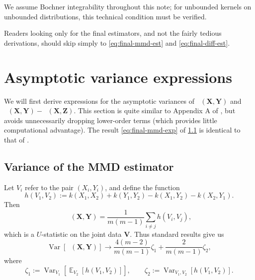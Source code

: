 \documentclass{article}
\DeclareMathOperator{\E}{\mathbb{E}}
\DeclareMathOperator{\Var}{Var}
\DeclareMathOperator{\mmdsqu}{\widehat{MMD}_U^2}
\newcommand{\setX}{\mathbf{X}}
\newcommand{\setY}{\mathbf{Y}}
\newcommand{\setZ}{\mathbf{Z}}
\newcommand{\setV}{\mathbf{V}}
\begin{document}
We assume Bochner integrability throughout this note;
for unbounded kernels on unbounded distributions,
this technical condition must be verified.

Readers looking only for the final estimators, and not the fairly tedious derivations,
should skip simply to \eqref{eq:final-mmd-est} and \eqref{eq:final-diff-est}. 


\section{Asymptotic variance expressions} \label{sec:var-expressions}

We will first derive expressions for the asymptotic variances of
$\mmdsqu(\setX, \setY)$
and $\mmdsqu(\setX, \setY) - \mmdsqu(\setX, \setZ)$.
This section is quite similar to Appendix A of \textcite{three-sample},
but avoids unnecessarily dropping lower-order terms (which provides little computational advantage).
The result \eqref{eq:final-mmd-exp} of \cref{sec:mmd-expression} is identical to that of \textcite{opt-mmd}.


\subsection{Variance of the MMD estimator} \label{sec:mmd-expression}

Let $V_i$ refer to the pair $(X_i, Y_i)$,
and define the function
\[
    h(V_1, V_2) := k(X_1, X_2) + k(Y_1, Y_2) - k(X_1, Y_2) - k(X_2, Y_1)
.\]
Then \[
\mmdsqu(\setX, \setY) = \frac{1}{m (m-1)} \sum_{i \ne j} h(V_i, V_j)
,\]
which is a $U$-statistic on the joint data $\setV$.
Thus standard results \parencite[Chapter~5]{serfling}
give us
\[
    \Var\left[ \mmdsqu(\setX, \setY) \right]
    \to \frac{4 (m-2)}{m (m-1)} \zeta_1 + \frac{2}{m (m-1)} \zeta_2
,\] where
\[
    \zeta_1 := \Var_{V_1}\left[ \E_{V_2}\left[ h(V_1, V_2) \right] \right],
    \qquad
    \zeta_2 := \Var_{V_1, V_2}\left[ h(V_1, V_2) \right]
.\]
\end{document}
